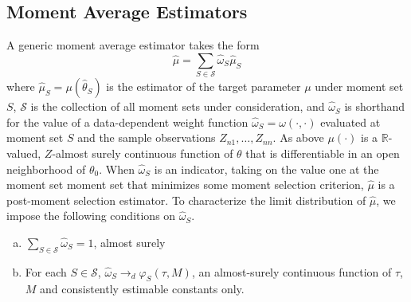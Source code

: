 \subsection{Moment Average Estimators}
A generic moment average estimator takes the form
\begin{equation}
	\label{eq:avg}
	\widehat{\mu}=\sum_{S \in \mathscr{S}} \widehat{\omega}_S\widehat{\mu}_S
\end{equation}
where $\widehat{\mu}_S = \mu(\widehat{\theta}_S)$ is the estimator of the target parameter $\mu$ under moment set $S$, $\mathscr{S}$ is the collection of all moment sets under consideration, and $\widehat{\omega}_S$ is shorthand for the value of a data-dependent weight function  $\widehat{\omega}_S=\omega(\cdot, \cdot)$ evaluated at moment set $S$ and the sample observations $Z_{n1}, \hdots, Z_{nn}$.  
As above $\mu(\cdot)$ is a $\mathbb{R}$-valued, $Z$-almost surely continuous function of $\theta$ that is differentiable in an open neighborhood of $\theta_0$. When $\widehat{\omega}_S$ is an indicator, taking on the value one at the moment set moment set that minimizes some moment selection criterion, $\widehat{\mu}$ is a post-moment selection estimator. To characterize the limit distribution of $\widehat{\mu}$, we impose the following conditions on $\widehat{\omega}_S$.
\begin{assump}\mbox{}
\label{assump:weights}
\begin{enumerate}[(a)]
	\item $\sum_{S \in \mathscr{S}} \widehat{\omega}_S = 1$, almost surely 
	\item For each $S\in \mathscr{S}$, $\widehat{\omega}_S \rightarrow_d\varphi_S(\tau, M)$, an almost-surely continuous function of $\tau$, $M$ and consistently estimable constants only.
\end{enumerate}
\end{assump}


